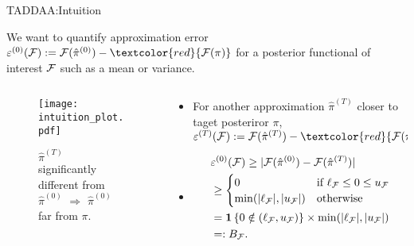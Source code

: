 \documentclass[10pt,xcolor=table]{beamer}
\begin{document}
\begin{frame}{TADDAA:Intuition}
	
  We want to quantify approximation error $\varepsilon^{(0)}(\mcF) \defas \mcF(\initialDensity) - \textcolor{red}{\mcF(\posteriorDensity)}$ for a posterior functional of interest $\mathcal{F}$ such as a mean or variance.
  \begin{columns}
    \begin{column}{.44\textwidth}
      \begin{figure}[t]
        \texttt{[image: intuition\_plot.pdf]}
        \caption{$\hat{\pi}^{(T)}$ significantly different from $\hat{\pi}^{(0)}$ $\Rightarrow$ $\hat{\pi}^{(0)}$ far from $\pi$.}
      \end{figure}
    \end{column}
    \begin{column}{.6\textwidth}
        \begin{itemize}
        \item For another approximation $\hat{\pi}^{(T)}$ closer to taget posteriror $\pi$, $\varepsilon^{(T)}(\mcF) \defas \mcF(\improvedDensity) - \textcolor{red}{\mcF(\posteriorDensity)}$
        \item 
        \begin{equation*}
		\begin{aligned}
			&\varepsilon^{(0)}(\mathcal{F})
			\ge |\mathcal{F}(\hat{\pi}^{(0)}) - \mathcal{F}(\hat{\pi}^{(T)})| \\
			&\ge \begin{cases}
				0 & \text{if $\ell_{\mathcal{F}} \le 0 \le u_{\mathcal{F}}$} \\
				\min(|\ell_{\mathcal{F}}|, |u_{\mathcal{F}}|) & \text{otherwise} 
			\end{cases} \\
			&= \mathbf{1} \left\{0 \notin (\ell_{\mathcal{F}},  u_{\mathcal{F}})\right\} \times \min(|\ell_{\mathcal{F}}|, |u_{\mathcal{F}}|) \\
			&=:  B_{\mathcal{F}}. 
		\end{aligned}
		\end{equation*}
        \end{itemize}
    \end{column}
  \end{columns}
  
\end{frame}
\end{document}
